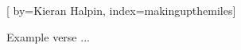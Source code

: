 
[%
    by={Kieran Halpin},
    index={makingupthemiles}]


    \label{makingupthemiles}

    \beginverse
        Example verse ...
    \endverse
\endsong
